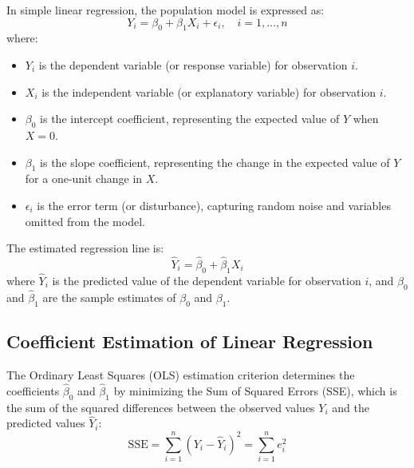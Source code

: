 In simple linear regression, the population model is expressed as:
\begin{equation}
	Y_i = \beta_0 + \beta_1 X_i + \epsilon_i, \quad i = 1, \dots, n
	\label{eq:pop_regression_m10}
\end{equation}
where:
\begin{itemize}
	\item $Y_i$ is the dependent variable (or response variable) for observation $i$.
	\item $X_i$ is the independent variable (or explanatory variable) for observation $i$.
	\item $\beta_0$ is the intercept coefficient, representing the expected value of $Y$ when $X = 0$.
	\item $\beta_1$ is the slope coefficient, representing the change in the expected value of $Y$ for a one-unit change in $X$.
	\item $\epsilon_i$ is the error term (or disturbance), capturing random noise and variables omitted from the model.
\end{itemize}

The estimated regression line is:
\begin{equation}
	\hat{Y}_i = \hat{\beta}_0 + \hat{\beta}_1 X_i
	\label{eq:est_regression_m10}
\end{equation}
where $\hat{Y}_i$ is the predicted value of the dependent variable for observation $i$, and $\hat{\beta}_0$ and $\hat{\beta}_1$ are the sample estimates of $\beta_0$ and $\beta_1$.

\subsection{Coefficient Estimation of Linear Regression}
The Ordinary Least Squares (OLS) estimation criterion determines the coefficients $\hat{\beta}_0$ and $\hat{\beta}_1$ by minimizing the Sum of Squared Errors (SSE), which is the sum of the squared differences between the observed values $Y_i$ and the predicted values $\hat{Y}_i$:
\begin{equation}
	\text{SSE} = \sum_{i=1}^n (Y_i - \hat{Y}_i)^2 = \sum_{i=1}^n e_i^2
	\label{eq:sse_definition_m10}
\end{equation}

